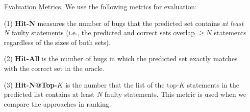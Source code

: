 \underline{Evaluation Metrics.}  
We use the following metrics for evaluation:

(1) {\bf Hit-N} measures the number of bugs that the predicted set
contains {\em at least} $N$ faulty statements (i.e., the predicted
and correct sets overlap $\geq$$N$ statements regardless of the sizes of both sets).

(2) {\bf Hit-All} is the number of bugs in which the predicted set exactly
matches with the correct set in the oracle.




(3) {\bf Hit-N@Top-$K$} is the number that the list of the top-$K$
statements in the predicted list contains at least $N$ faulty
statements. This metric is used when we compare the approaches in
ranking.







